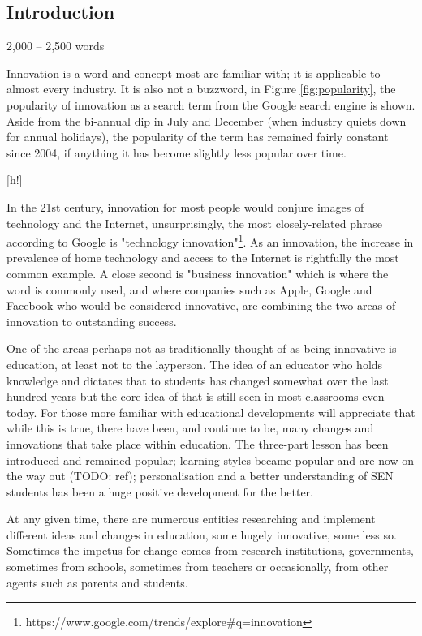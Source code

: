 \subsection{Introduction}
2,000 – 2,500 words\citep{Frame61:online}

Innovation is a word and concept most are familiar with; it is applicable to almost every industry. It is also not a buzzword, in Figure \ref{fig:popularity}, the popularity of innovation as a search term from the Google search engine is shown. Aside from the bi-annual dip in July and December (when industry quiets down for annual holidays), the popularity of the term has remained fairly constant since 2004, if anything it has become slightly less popular over time.

[h!]

In the 21st century, innovation for most people would conjure images of technology and the Internet, unsurprisingly, the most closely-related phrase according to Google is "technology innovation"\footnote{https://www.google.com/trends/explore\#q=innovation}. As an innovation, the increase in prevalence of home technology and access to the Internet is rightfully the most common example. A close second is "business innovation" which is where the word is commonly used, and where companies such as Apple, Google and Facebook who would be considered innovative, are combining the two areas of innovation to outstanding success.

One of the areas perhaps not as traditionally thought of as being innovative is education, at least not to the layperson. The idea of an educator who holds knowledge and dictates that to students has changed somewhat over the last hundred years but the core idea of that is still seen in most classrooms even today. For those more familiar with educational developments will appreciate that while this is true, there have been, and continue to be, many changes and innovations that take place within education. The three-part lesson has been introduced and remained popular; learning styles became popular and are now on the way out (TODO: ref); personalisation and a better understanding of SEN students has been a huge positive development for the better.

At any given time, there are numerous entities researching and implement different ideas and changes in education, some hugely innovative, some less so. Sometimes the impetus for change comes from research institutions, governments, sometimes from schools, sometimes from teachers or occasionally, from other agents such as parents and students. 

